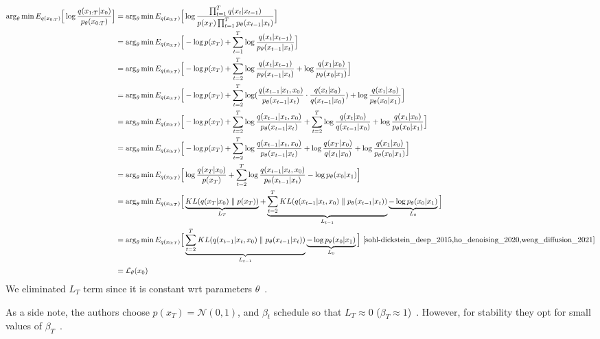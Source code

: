\documentclass{book}
\numberwithin{equation}{subsection}
\begin{document}
\begin{align}
\arg_\theta \min E_{q(x_{0:T})}\Big[\log\frac{q(x_{1:T}|x_0)}{p_\theta(x_{0:T})}\Big] &= \arg_\theta \min E_{q(x_{0:T})}\Big[ \log\frac{\prod_{t=1}^T q(x_t|x_{t-1})}{ p(x_T) \prod_{t=1}^T p_\theta(x_{t-1} |x_t) }\Big] \\
&= \arg_\theta \min E_{q(x_{0:T})}\Big[ -\log p(x_T) + \sum_{t=1}^T \log \frac{q(x_t|x_{t-1})}{p_\theta(x_{t-1} |x_t)}\Big] \\
&= \arg_\theta \min E_{q(x_{0:T})}\Big[ -\log p(x_T) + \sum_{t=2}^T \log \frac{q(x_t|x_{t-1})}{p_\theta(x_{t-1} |x_t)} + \log\frac{q(x_1 |x_0)}{p_\theta(x_0 |x_1)}\Big]\\
&= \arg_\theta \min E_{q(x_{0:T})}\Big[ -\log p(x_T) + \sum_{t=2}^T \log ( \frac{q(x_{t-1} |x_t, x_0)}{p_\theta(x_{t-1} |x_t)}\cdot \frac{q(x_t |x_0)}{q(x_{t-1}|x_0)} ) + \log \frac{q(x_1 |x_0)}{p_\theta(x_0 |x_1)} \Big]\label{x0cond}\\
&= \arg_\theta \min E_{q(x_{0:T})}\Big[ -\log p(x_T) + \sum_{t=2}^T \log \frac{q(x_{t-1} |x_t, x_0)}{p_\theta(x_{t-1} |x_t)} + \sum_{t=2}^T \log \frac{q(x_t |x_0)}{q(x_{t-1} |x_0)} + \log\frac{q(x_1 |x_0)}{p_\theta(x_0 |x_1)}\Big] \\
&= \arg_\theta \min E_{q(x_{0:T})}\Big[-\log p(x_T) + \sum_{t=2}^T \log \frac{q(x_{t-1} |x_t, x_0)}{p_\theta(x_{t-1} |x_t)} + \log\frac{q(x_T |x_0)}{q(x_1 |x_0)} + \log \frac{q(x_1 |x_0)}{p_\theta(x_0 |x_1)}\Big]\\
&= \arg_\theta \min E_{q(x_{0:T})}\Big[\log\frac{q(x_T |x_0)}{p(x_T)} + \sum_{t=2}^T \log \frac{q(x_{t-1} |x_t, x_0)}{p_\theta(x_{t-1} |x_t)} - \log p_\theta(x_0 |x_1)\Big] \\
&= \arg_\theta \min E_{q(x_{0:T})}\Big[\underbrace{KL(q(x_T |x_0) \parallel p(x_T))}_{L_T} + \underbrace{\sum_{t=2}^T KL(q(x_{t-1} |x_t, x_0) \parallel p_\theta(x_{t-1} |x_t))}_{L_{t-1}} \underbrace{- \log p_\theta(x_0 |x_1)}_{L_0}\Big]\\
&= \arg_\theta \min E_{q(x_{0:T})}\Big[\underbrace{\sum_{t=2}^T KL(q(x_{t-1} |x_t, x_0) \parallel p_\theta(x_{t-1} |x_t))}_{L_{t-1}} \underbrace{- \log p_\theta(x_0 |x_1)}_{L_0}\Big]~\cite{sohl-dickstein_deep_2015,ho_denoising_2020,weng_diffusion_2021}\\
&= \mathcal{L}_\theta(x_0)
\end{align}
We eliminated $L_T$ term since it is constant wrt parameters $\theta$~\cite{weng_diffusion_2021}. 

As a side note, the authors choose $p(x_T)=\mathcal{N}(0,1)$, and $\beta_t$ schedule so that $L_T \approx 0$ ($\beta_T \approx 1$)~\cite{ho_denoising_2020}. However, for stability they opt for small values of $\beta_T$~\cite{sohl-dickstein_deep_2015, ho_denoising_2020}.
\end{document}
